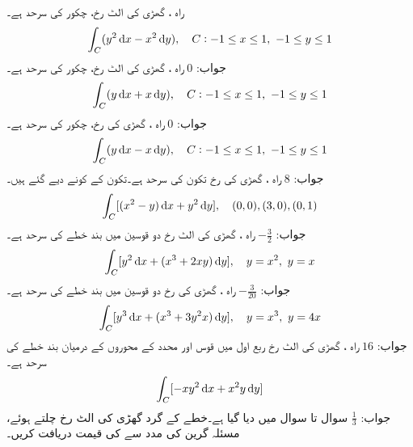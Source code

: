 \quad  راہ ،  گھڑی کی الٹ رخ، چکور کی سرحد  ہے۔\\
\begin{align*}
\int_C(y^2\dif x-x^2\dif y),\quad C:-1\le x\le 1,\,\, -1\le y\le 1
\end{align*}
جواب:\quad
$0$
\quad راہ ،  گھڑی کی الٹ رخ، چکور کی سرحد  ہے۔\\
\begin{align*}
\int_C(y\dif x+x\dif y),\quad C:-1\le x\le 1,\,\, -1\le y\le 1
\end{align*}
جواب:\quad
$0$
\quad راہ ،  گھڑی کی رخ، چکور کی سرحد  ہے۔\\
\begin{align*}
\int_C(y\dif x-x\dif y),\quad C:-1\le x\le 1,\,\, -1\le y\le 1
\end{align*}
جواب:\quad
$8$
\quad راہ ، گھڑی کی رخ تکون کی سرحد ہے۔تکون کے کونے دیے گئے ہیں۔\\
\begin{align*}
\int_C[(x^2-y)\dif x+y^2\dif y],\quad (0,0),(3,0),(0,1)
\end{align*}
جواب:\quad
$-\tfrac{3}{2}$
\quad راہ ، گھڑی کی الٹ رخ دو قوسین میں بند خطے کی سرحد ہے۔\\
\begin{align*}
\int_C [y^2\dif x+(x^3+2xy)\dif y],\quad y=x^2,\,\,y=x
\end{align*}
جواب:\quad
$-\tfrac{3}{20}$
\quad راہ ، گھڑی کی  رخ دو قوسین میں بند  خطے کی سرحد ہے۔\\
\begin{align*}
\int_C [y^3\dif x+(x^3+3y^2x)\dif y],\quad y=x^3,\,\,y=4x
\end{align*}
جواب:\quad
$16$
\quad راہ ، گھڑی کی  الٹ رخ ربع اول میں  قوس  اور محدد کے محوروں کے درمیان  بند خطے کی سرحد ہے۔\\
\begin{align*}
\int_C [-xy^2\dif x+x^2y\dif y]
\end{align*}
جواب:\quad
$\tfrac{1}{3}$
سوال  تا سوال  میں  دیا گیا ہے۔خطے کے گرد گھڑی کی الٹ رخ چلتے ہوئے،  مسئلہ گرین کی مدد سے   کی قیمت دریافت  کریں۔

